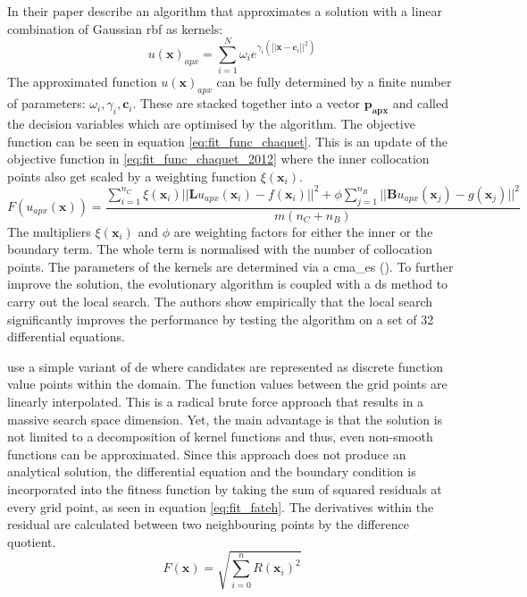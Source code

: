 \documentclass[./\jobname.tex]{subfiles}
\begin{document}
In their paper \cite{chaquet_using_2019} describe an algorithm that approximates a solution with a linear combination of Gaussian \gls{rbf} as kernels:
\begin{equation}
u(\mathbf{x})_{apx} = \sum_{i=1}^{N} \omega_i e^{\gamma_i (\left||\mathbf{x} - \mathbf{c}_i\right||^2)}
\end{equation}
The approximated function $u(\mathbf{x})_{apx}$ can be fully determined by a finite number of parameters: $\omega_i, \gamma_i, \mathbf{c}_i$. These are stacked together into a vector $\mathbf{p_{apx}}$ and called the decision variables which are optimised by the algorithm. 
The objective function can be seen in equation \eqref{eq:fit_func_chaquet}. This is an update of the objective function in \ref{eq:fit_func_chaquet_2012} where the inner collocation points also get scaled by a weighting function $\xi(\mathbf{x}_i)$.
\begin{equation}
\label{eq:fit_func_chaquet}
F(u_{apx}(\mathbf{x})) = \frac{\sum_{i=1}^{n_C} \xi (\mathbf{x}_i) || \mathbf{L}u_{apx}(\mathbf{x}_i) - f(\mathbf{x}_i)||^2 + \phi \sum_{j=1}^{n_B} || \mathbf{B}u_{apx}(\mathbf{x}_j) - g(\mathbf{x}_j)||^2}{m (n_C + n_B)}  
\end{equation}
The multipliers $\xi(\mathbf{x}_i)$ and $\phi$ are weighting factors for either the inner or the boundary term. The whole term is normalised with the number of collocation points. 
The parameters of the kernels are determined via a \gls{cma_es} (\cite{hansen_reducing_2003}). To further improve the solution, the evolutionary algorithm is coupled with a \gls{ds} method to carry out the local search. The authors show empirically that the local search significantly improves the performance by testing the algorithm on a set of 32 differential equations. 

\cite{fateh_differential_2019} use a simple variant of \gls{de} where candidates are represented as discrete function value points within the domain. The function values between the grid points are linearly interpolated. This is a radical brute force approach that results in a massive search space dimension. Yet, the main advantage is that the solution is not limited to a decomposition of kernel functions and thus, even non-smooth functions can be approximated. Since this approach does not produce an analytical solution, the differential equation and the boundary condition is incorporated into the fitness function by taking the sum of squared residuals at every grid point, as seen in equation \eqref{eq:fit_fateh}. The derivatives within the residual are calculated between two neighbouring points by the difference quotient. 
\begin{equation}
\label{eq:fit_fateh}
F(\mathbf{x}) = \sqrt{\sum_{i=0}^{n} R(\mathbf{x}_i)^2}
\end{equation}
\end{document}
